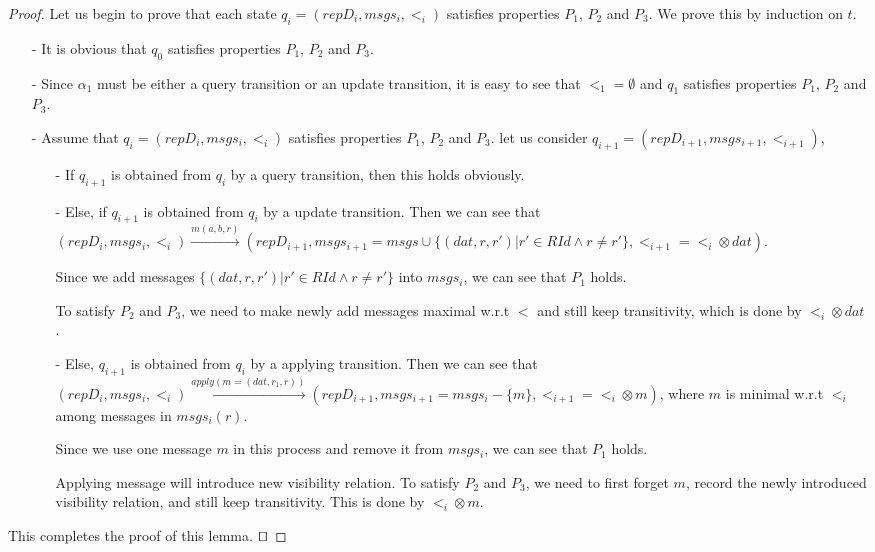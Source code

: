 {\begin {proof}
Let us begin to prove that each state $q_i=(repD_i,msgs_i,<_i)$ satisfies properties $P_1$, $P_2$ and $P_3$. We prove this by induction on $t$.

\begin{itemize}
\setlength{\itemsep}{0.5pt}
\item[-] It is obvious that $q_0$ satisfies properties $P_1$, $P_2$ and $P_3$.

\item[-] Since $\alpha_1$ must be either a query transition or an update transition, it is easy to see that $<_1 = \emptyset$ and $q_1$ satisfies properties $P_1$, $P_2$ and $P_3$.

\item[-] Assume that $q_i=(repD_i,msgs_i,<_i)$ satisfies properties $P_1$, $P_2$ and $P_3$. let us consider $q_{i+1}= (repD_{i+1},msgs_{i+1},<_{i+1})$,

    \begin{itemize}
    \setlength{\itemsep}{0.5pt}
    \item[-] If $q_{i+1}$ is obtained from $q_i$ by a query transition, then this holds obviously.

    \item[-] Else, if $q_{i+1}$ is obtained from $q_i$ by a update transition. Then we can see that $(repD_i,msgs_i,<_i) {\xrightarrow{m(a,b,r)}} (repD_{i+1},msgs_{i+1}=msgs \cup \{ (dat,r,r') \vert  r' \in RId \wedge r \neq r' \},<_{i+1} = <_i \otimes dat)$.

        Since we add messages $\{ (dat,r,r') \vert  r' \in RId \wedge r \neq r' \}$ into $msgs_i$, we can see that $P_1$ holds.

        To satisfy $P_2$ and $P_3$, we need to make newly add messages maximal w.r.t $<$ and still keep transitivity, which is done by $<_i \otimes dat$.

    \item[-] Else, $q_{i+1}$ is obtained from $q_i$ by a applying transition. Then we can see that $(repD_i,msgs_i,<_i) {\xrightarrow{apply(m=(dat,r_1,r))}} (repD_{i+1},msgs_{i+1} = msgs_i - \{ m \}, <_{i+1} = <_i \otimes m )$, where $m$ is minimal w.r.t $<_i$ among messages in $msgs_i(r)$.

        Since we use one message $m$ in this process and remove it from $msgs_i$, we can see that $P_1$ holds.

        Applying message will introduce new visibility relation. To satisfy $P_2$ and $P_3$, we need to first forget $m$, record the newly introduced visibility relation, and still keep transitivity. This is done by $<_i \otimes m$.
    \end{itemize}
\end{itemize}

This completes the proof of this lemma. $\qed$
\end {proof}
}





